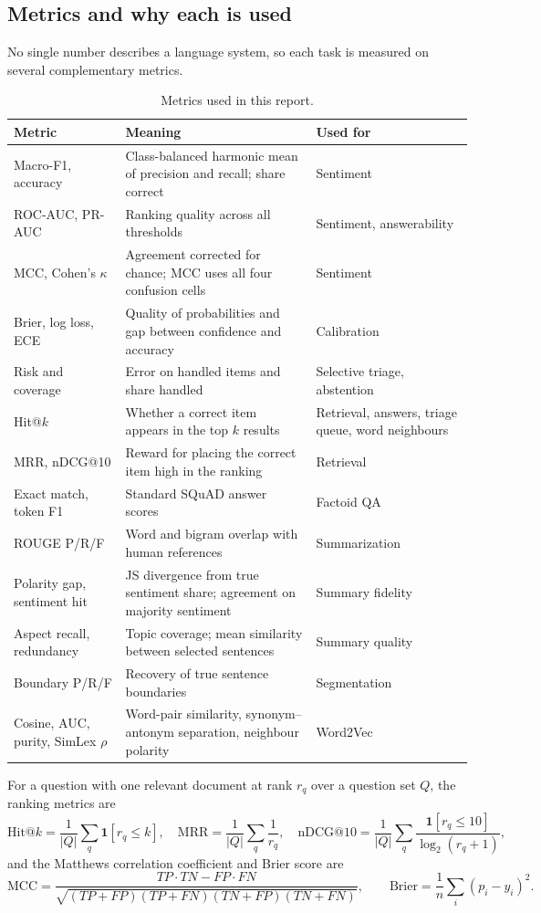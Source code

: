 \documentclass[11pt,a4paper]{article}
\begin{document}
\subsection{Metrics and why each is used}
No single number describes a language system, so each task is measured on several complementary metrics.
\begin{table}[H]\centering\footnotesize
\caption{Metrics used in this report.}\label{tab:metrics}
\begin{tabular}{p{3.1cm}p{7.6cm}p{3.2cm}}
\toprule
Metric & Meaning & Used for\\
\midrule
Macro-F1, accuracy & Class-balanced harmonic mean of precision and recall; share correct & Sentiment\\
ROC-AUC, PR-AUC & Ranking quality across all thresholds & Sentiment, answerability\\
MCC, Cohen's $\kappa$ & Agreement corrected for chance; MCC uses all four confusion cells & Sentiment\\
Brier, log loss, ECE & Quality of probabilities and gap between confidence and accuracy & Calibration\\
Risk and coverage & Error on handled items and share handled & Selective triage, abstention\\
Hit@$k$ & Whether a correct item appears in the top $k$ results & Retrieval, answers, triage queue, word neighbours\\
MRR, nDCG@10 & Reward for placing the correct item high in the ranking & Retrieval\\
Exact match, token F1 & Standard SQuAD answer scores & Factoid QA\\
ROUGE P/R/F & Word and bigram overlap with human references & Summarization\\
Polarity gap, sentiment hit & JS divergence from true sentiment share; agreement on majority sentiment & Summary fidelity\\
Aspect recall, redundancy & Topic coverage; mean similarity between selected sentences & Summary quality\\
Boundary P/R/F & Recovery of true sentence boundaries & Segmentation\\
Cosine, AUC, purity, SimLex $\rho$ & Word-pair similarity, synonym--antonym separation, neighbour polarity & Word2Vec\\
\bottomrule
\end{tabular}
\end{table}
For a question with one relevant document at rank $r_q$ over a question set $Q$, the ranking metrics are
\begin{equation}
\mathrm{Hit@}k=\frac{1}{|Q|}\sum_{q}\mathbf{1}[r_q\le k],\quad
\mathrm{MRR}=\frac{1}{|Q|}\sum_{q}\frac{1}{r_q},\quad
\mathrm{nDCG@}10=\frac{1}{|Q|}\sum_{q}\frac{\mathbf{1}[r_q\le 10]}{\log_2(r_q+1)},
\end{equation}
and the Matthews correlation coefficient and Brier score are
\begin{equation}
\mathrm{MCC}=\frac{TP\cdot TN-FP\cdot FN}{\sqrt{(TP+FP)(TP+FN)(TN+FP)(TN+FN)}},\qquad
\mathrm{Brier}=\frac{1}{n}\sum_i(p_i-y_i)^2.
\end{equation}
\end{document}
